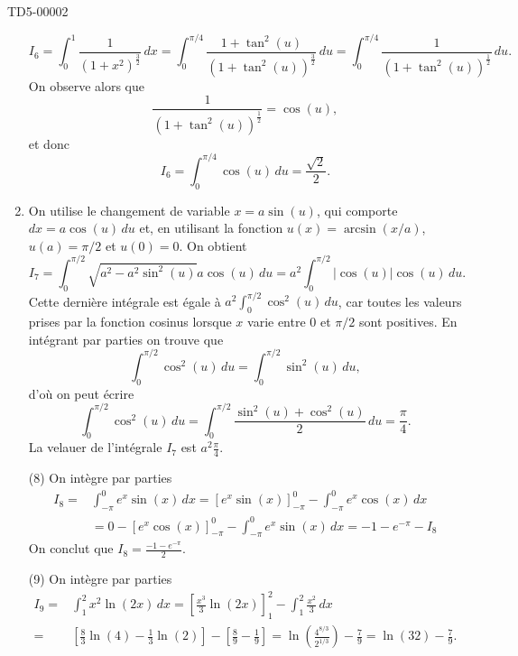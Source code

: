 \begin{corrige}{TD5-00002}
\begin{enumerate}
    \[
    I_{6}=\int_{0}^{1}\frac{1}{(1+x^2)^{\frac{3}{2}}}\, dx  = \int_{0}^{\pi/4}\frac{1+\tan^2(u)}{(1+\tan^2(u))^{\frac{3}{2}}}\, du= \int_{0}^{\pi/4}\frac{1}{(1+\tan^2(u))^{\frac{1}{2}}}\, du.
    \]
    On observe alors que 
    \[
    \frac{1}{(1+\tan^2(u))^{\frac{1}{2}}} = \cos(u),
    \]
    et donc 
    \[
    I_{6}= \int_{0}^{\pi/4}\cos(u)\, du = \frac{\sqrt{2}}{2}.
    \]
  \item On utilise le changement de variable $x = a\sin(u)$, qui comporte $dx = a\cos(u)\,du$ et, en utilisant la fonction $u(x) = \arcsin(x/a)$, $u(a) = \pi/2$  et  $u(0) = 0$. On obtient
\[
 I_{7}=\int_{0}^{\pi/2}\sqrt{a^2-a^2\sin^2(u)} a\cos(u)\, du = a^2\int_{0}^{\pi/2} |\cos(u)|\cos(u)\, du.
\]
Cette dernière intégrale est égale à $\displaystyle a^2\int_{0}^{\pi/2} \cos^2(u)\, du$, car toutes les valeurs prises par la fonction cosinus lorsque $x$ varie entre $0$ et $\pi/2$ sont positives. En intégrant par parties on trouve que 
 \[
\int_{0}^{\pi/2} \cos^2(u)\, du =\int_{0}^{\pi/2} \sin^2(u)\, du,
\]
d'où on peut écrire 
 \[
\int_{0}^{\pi/2} \cos^2(u)\, du =\int_{0}^{\pi/2} \frac{\sin^2(u) +\cos^2(u)}{2}\, du = \frac{\pi}{4}.
\]
La velauer de l'intégrale $ I_{7}$ est $a^2\frac{\pi}{4}$.
    \item[(8)]  On intègre par parties 
      \begin{equation*}
        \begin{aligned}
           I_{8}=&\int_{-\pi}^{0} e^x\sin(x) \, dx =  \left[e^x\sin(x)\right]_{-\pi}^{0}-\int_{-\pi}^{0} e^x\cos(x) \, dx \\
           &= 0 -\left[e^x\cos(x)\right]_{-\pi}^{0}-\int_{-\pi}^{0} e^x\sin(x) \, dx = -1-e^{-\pi}-I_{8}
           \end{aligned}
      \end{equation*}
      On conclut que $I_{8} = \frac{-1-e^{-\pi}}{2}$.
    \item[(9)]  On intègre par parties 
      \begin{equation*}
        \begin{aligned}
      I_{9}=&\int_{1}^{2} x^2\ln(2x) \, dx = \left[\frac{x^3}{3}\ln(2x)\right]_{1}^{2} - \int_{1}^{2} \frac{x^2}{3} \, dx \\
      =& \left[\frac{8}{3}\ln(4) - \frac{1}{3}\ln(2)\right] -\left[\frac{8}{9}-\frac{1}{9}\right] = \ln\left(\frac{4^{8/3}}{2^{1/3}}\right)-\frac{7}{9} =\ln\left(32\right)-\frac{7}{9}.  
        \end{aligned}
      \end{equation*}
     

\end{enumerate}
\end{corrige}
